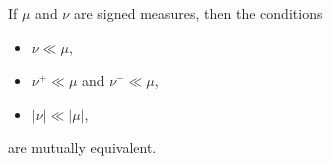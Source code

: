 If $\mu$ and $\nu$ are signed measures, then the conditions
\begin{itemize}
\item[(a)] $\nu \ll \mu$,
\item[(b)] $\nu^+ \ll \mu$ and $\nu^- \ll \mu$,
\item[(c)] $|\nu| \ll |\mu|$,
\end{itemize}
are mutually equivalent.
